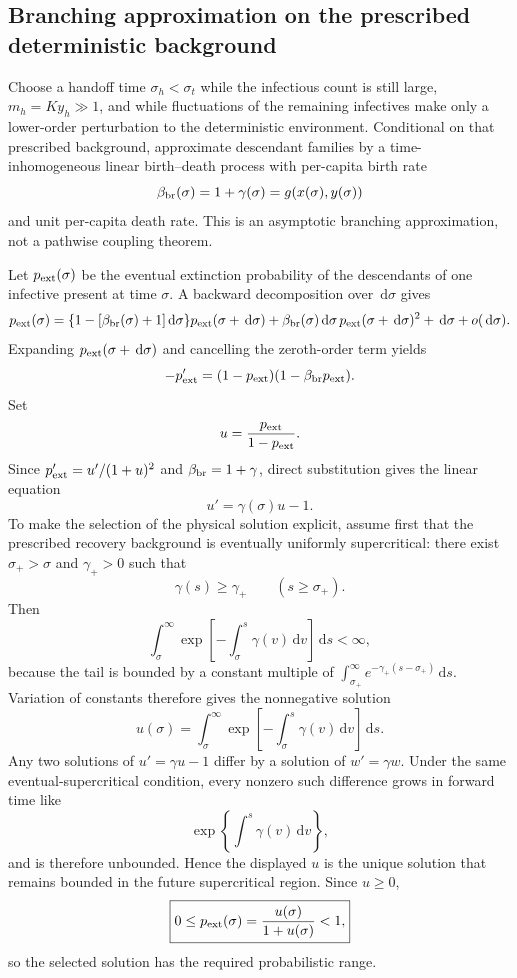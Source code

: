 \documentclass[11pt]{article}
\newcommand{\dd}{\,\mathrm{d}}
\begin{document}
\subsection{Branching approximation on the prescribed deterministic background}
Choose a handoff time $\sigma_h<\sigma_t$ while the infectious count is still large, $m_h=K y_h\gg1$, and while fluctuations of the remaining infectives make only a lower-order perturbation to the deterministic environment.  Conditional on that prescribed background, approximate descendant families by a time-inhomogeneous linear birth--death process with per-capita birth rate
\[
\beta_{\rm br}(\sigma)=1+\gamma(\sigma)=g(x(\sigma),y(\sigma))
\]
and unit per-capita death rate.  This is an asymptotic branching approximation, not a pathwise coupling theorem.

Let $p_{\rm ext}(\sigma)$ be the eventual extinction probability of the descendants of one infective present at time $\sigma$.  A backward decomposition over $\dd\sigma$ gives
\[
p_{\rm ext}(\sigma)=
\{1-[\beta_{\rm br}(\sigma)+1]\dd\sigma\}p_{\rm ext}(\sigma+\dd\sigma)
+\beta_{\rm br}(\sigma)\dd\sigma\,p_{\rm ext}(\sigma+\dd\sigma)^2
+\dd\sigma+o(\dd\sigma).
\]
Expanding $p_{\rm ext}(\sigma+\dd\sigma)$ and cancelling the zeroth-order term yields
\[
-p_{\rm ext}'=(1-p_{\rm ext})(1-\beta_{\rm br}p_{\rm ext}).
\]
Set
\[
u=\frac{p_{\rm ext}}{1-p_{\rm ext}}.
\]
Since $p_{\rm ext}'=u'/(1+u)^2$ and $\beta_{\rm br}=1+\gamma$, direct substitution gives the linear equation
\[
\boxed{u'=\gamma(\sigma)u-1.}
\]
To make the selection of the physical solution explicit, assume first that the prescribed recovery background is eventually uniformly supercritical: there exist $\sigma_+>\sigma$ and $\gamma_+>0$ such that
\[
\gamma(s)\geq\gamma_+\qquad(s\geq\sigma_+).
\]
Then
\[
\int_\sigma^\infty
\exp\left[-\int_\sigma^s\gamma(v)\dd v\right]\dd s<\infty,
\]
because the tail is bounded by a constant multiple of $\int_{\sigma_+}^\infty e^{-\gamma_+(s-\sigma_+)}\dd s$. Variation of constants therefore gives the nonnegative solution
\[
\boxed{
u(\sigma)=\int_\sigma^\infty
\exp\left[-\int_\sigma^s \gamma(v)\dd v\right]\dd s.}
\]
Any two solutions of $u'=\gamma u-1$ differ by a solution of $w'=\gamma w$. Under the same eventual-supercritical condition, every nonzero such difference grows in forward time like
\[
\exp\left\{\int^s\gamma(v)\dd v\right\},
\]
and is therefore unbounded. Hence the displayed $u$ is the unique solution that remains bounded in the future supercritical region. Since $u\geq0$,
\[
\boxed{0\leq p_{\rm ext}(\sigma)=\frac{u(\sigma)}{1+u(\sigma)}<1,}
\]
so the selected solution has the required probabilistic range.
\end{document}
